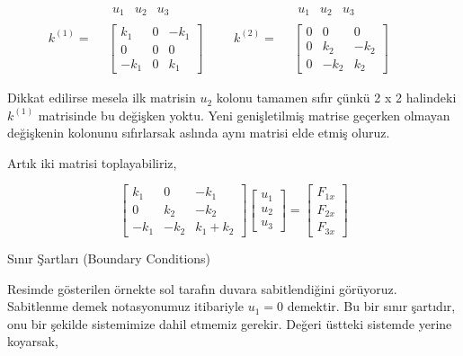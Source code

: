 \documentclass[12pt,fleqn]{article}\usepackage{../../common}
\begin{document}
$$
k^{(1)} =
\begin{array}{cc} & \begin{array}{ccc} u_1 & u_2 & u_3 \end{array} \\ &
\left[
\begin{array}{ccc}
k_1 & 0 & -k_1 \\
0 & 0 & 0 \\
-k_1 & 0 & k_1
\end{array}
\right]
\end{array} \qquad
k^{(2)} =
\begin{array}{cc} & \begin{array}{ccc} u_1 & u_2 & u_3 \end{array} \\ &
\left[
\begin{array}{ccc}
0 & 0 & 0 \\
0 & k_2 & -k_2 \\
0 & -k_2 & k_2
\end{array}
\right]
\end{array} \qquad
$$

Dikkat edilirse mesela ilk matrisin $u_2$ kolonu tamamen sıfır çünkü 2 x 2
halindeki $k^{(1)}$ matrisinde bu değişken yoktu. Yeni genişletilmiş matrise
geçerken olmayan değişkenin kolonunu sıfırlarsak aslında aynı matrisi elde etmiş
oluruz.

Artık iki matrisi toplayabiliriz,

$$
\left[\begin{array}{ccc}
k_1 & 0 & -k_1 \\
0 & k_2 & -k_2 \\
-k_1 & -k_2 & k_1+k_2
\end{array}\right]
\left[\begin{array}{c}
u_1 \\ u_2 \\ u_3
\end{array}\right] =
\left[\begin{array}{c}
F_{1x} \\ F_{2x} \\ F_{3x}
\end{array}\right]
$$

Sınır Şartları (Boundary Conditions)

Resimde gösterilen örnekte sol tarafın duvara sabitlendiğini görüyoruz.
Sabitlenme demek notasyonumuz itibariyle $u_1 = 0$ demektir. Bu bir
sınır şartıdır, onu bir şekilde sistemimize dahil etmemiz gerekir.
Değeri üstteki sistemde yerine koyarsak,
\end{document}
